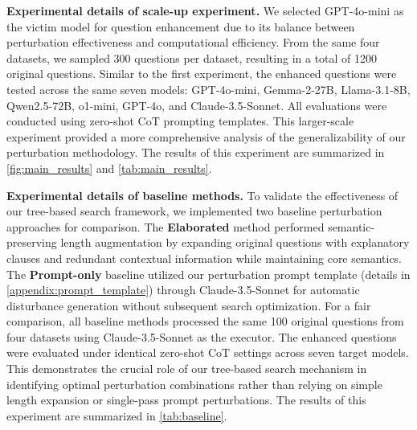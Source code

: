 \textbf{Experimental details of scale-up experiment.} We selected GPT-4o-mini as the victim model for question enhancement due to its balance between perturbation effectiveness and computational efficiency. From the same four datasets, we sampled 300 questions per dataset, resulting in a total of 1200 original questions. Similar to the first experiment, the enhanced questions were tested across the same seven models: GPT-4o-mini, Gemma-2-27B, Llama-3.1-8B, Qwen2.5-72B, o1-mini, GPT-4o, and Claude-3.5-Sonnet. All evaluations were conducted using zero-shot CoT prompting templates. This larger-scale experiment provided a more comprehensive analysis of the generalizability of our perturbation methodology.
The results of this experiment are summarized in \autoref{fig:main_results} and \autoref{tab:main_results}.

\textbf{Experimental details of baseline methods.} To validate the effectiveness of our tree-based search framework, we implemented two baseline perturbation approaches for comparison. The \textbf{Elaborated} method performed semantic-preserving length augmentation by expanding original questions with explanatory clauses and redundant contextual information while maintaining core semantics. The \textbf{Prompt-only} baseline utilized our perturbation prompt template (details in \autoref{appendix:prompt_template}) through Claude-3.5-Sonnet for automatic disturbance generation without subsequent search optimization. For a fair comparison, all baseline methods processed the same 100 original questions from four datasets using Claude-3.5-Sonnet as the executor. The enhanced questions were evaluated under identical zero-shot CoT settings across seven target models. This demonstrates the crucial role of our tree-based search mechanism in identifying optimal perturbation combinations rather than relying on simple length expansion or single-pass prompt perturbations.
The results of this experiment are summarized in \autoref{tab:baseline}.

